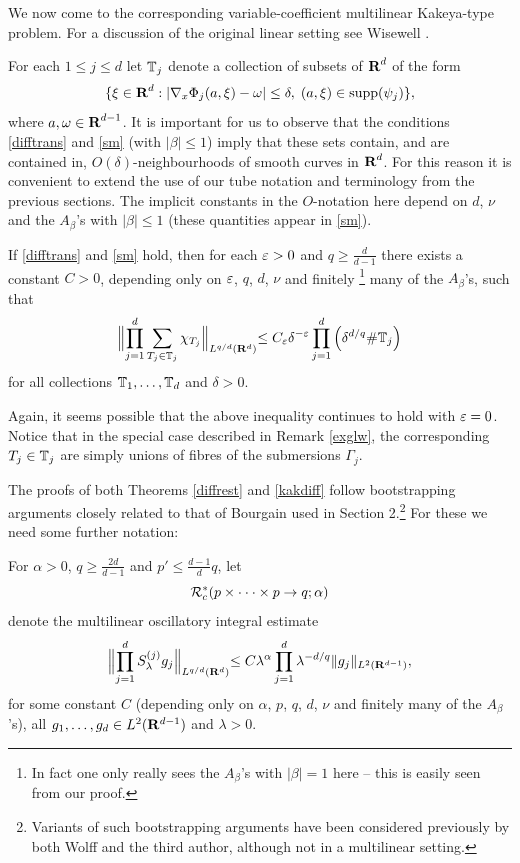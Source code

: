 We now come to the corresponding variable-coefficient multilinear
Kakeya-type problem. For a discussion of the original linear
setting see Wisewell \cite{wisewell}.


For each $1\leq j\leq d$ let ${\mathbb{T}}_{j}$ denote a collection of
subsets of ${\hbox{\bf R}}^{d}$ of the form
$$\{\xi\in{\hbox{\bf R}}^{d}:
|\nabla_{x}\Phi_{j}(a,\xi)-\omega|\leq\delta,\;
(a,\xi)\in{\operatorname{supp}}(\psi_j)\},
$$
where $a,\omega\in{\hbox{\bf R}}^{d-1}$. It is important for us to observe
that the conditions \eqref{difftrans} and \eqref{sm} (with
$|\beta| \leq 1$) imply that these sets contain, and are contained in,
$O(\delta)$-neighbourhoods of smooth curves in ${\hbox{\bf R}}^d$. For this
reason it is convenient to extend the use of our tube notation and
terminology from the previous sections. The implicit constants in
the $O$-notation here depend on $d$, $\nu$ and the $A_{\beta}$'s
with $|\beta| \leq 1$ (these quantities appear in \eqref{sm}).

\begin{theorem}\label{kakdiff} If \eqref{difftrans} and \eqref{sm} hold, then
for each $\varepsilon>0$ and $q\geq \tfrac{d}{d-1}$ there exists a
constant $C>0$, depending only on $\varepsilon$, $q$, $d$, $\nu$ and
finitely \footnote{In fact one only really sees the $A_{\beta}$'s
with $|\beta|=1$ here -- this is easily seen from our proof.} many
of the $A_{\beta}$'s, such that
$$
\Bigl\|\prod_{j=1}^{d}\sum_{T_{j}\in{\mathbb{T}}_{j}}\chi_{T_{j}}\Bigl\|_{L^{q/d}({\bf
R}^d)}\leq
C_{\varepsilon}\delta^{-\varepsilon}\prod_{j=1}^{d}\left(\delta^{d/q}\mbox{\#}{\mathbb{T}}_{j}\right)
$$
for all collections ${\mathbb{T}}_{1},\hdots,{\mathbb{T}}_{d}$ and $\delta>0$.
\end{theorem}
\begin{remark}
Again, it seems possible that the above inequality continues to hold
with $\varepsilon=0$. Notice that in the special case described in
Remark \ref{exglw}, the corresponding $T_j\in{\mathbb{T}}_j$ are simply
unions of fibres of the submersions $\Gamma_j$.
\end{remark}
The proofs of both Theorems \ref{diffrest} and \ref{kakdiff}
follow bootstrapping arguments closely related to that of Bourgain
used in Section 2.\footnote{Variants of such bootstrapping
arguments have been considered previously by both Wolff and
the third author, although not in a multilinear setting.} For these we
need some further notation:

For $\alpha>0$, $q\geq\tfrac{2d}{d-1}$ and
$p'\leq\tfrac{d-1}{d}q$, let
$${\mathcal{R}}^{*}_{c}(p\times\cdot\cdot\cdot\times p\rightarrow
q;\alpha)$$ denote the multilinear oscillatory integral estimate
$$
\Bigl\|\prod_{j=1}^{d}S_{\lambda}^{(j)}g_{j}\Bigl\|_{L^{q/d}({\bf
R}^{d})} \leq
C\lambda^{\alpha}\prod_{j=1}^{d}\lambda^{-d/q}\|g_{j}\|_{L^{2}({\bf
R}^{d-1})},
$$
for some constant $C$ (depending only on $\alpha$, $p$, $q$, $d$,
$\nu$ and finitely many of the $A_{\beta}$'s), all
$g_{1},\hdots,g_{d}\in L^{2}({\bf R}^{d-1})$ and $\lambda> 0$.

